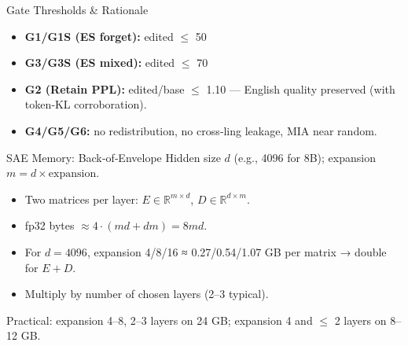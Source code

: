 \documentclass[aspectratio=169]{beamer}
\begin{document}
\begin{frame}{Gate Thresholds & Rationale}
\small
\begin{itemize}
  \item \textbf{G1/G1S (ES forget):} edited $\leq$  50%
  \item \textbf{G3/G3S (ES mixed):} edited $\leq$  70%
  \item \textbf{G2 (Retain PPL):} edited/base $\leq$  1.10 — English quality preserved (with token‑KL corroboration).
  \item \textbf{G4/G5/G6:} no redistribution, no cross‑ling leakage, MIA near random.
\end{itemize}
\end{frame}

\begin{frame}{SAE Memory: Back‑of‑Envelope}
\small Hidden size $d$ (e.g., 4096 for 8B); expansion $m = d\times\text{expansion}$.
\begin{itemize}
  \item Two matrices per layer: $E\in\mathbb{R}^{m\times d}$, $D\in\mathbb{R}^{d\times m}$.
  \item fp32 bytes $\approx 4\cdot (md + dm) = 8md$.
  \item For $d{=}4096$, expansion 4/8/16 ≈ 0.27/0.54/1.07 GB per matrix → double for $E{+}D$.
  \item Multiply by number of chosen layers (2–3 typical).
\end{itemize}
\vspace{2mm}
\small Practical: expansion 4–8, 2–3 layers on 24 GB; expansion 4 and $\leq$ 2 layers on 8–12 GB.
\end{frame}
\end{document}
